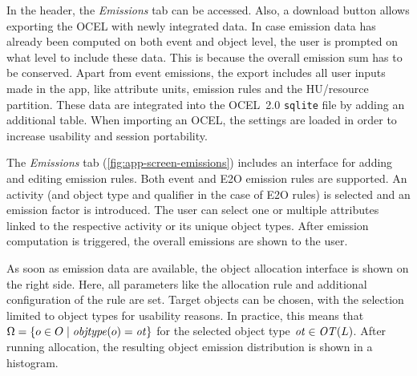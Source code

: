 In the header, the \textit{Emissions} tab can be accessed. Also, a download button allows exporting the OCEL with newly integrated data.
In case emission data has already been computed on both event and object level,
the user is prompted on what level to include these data.
This is because the overall emission sum has to be conserved.
Apart from event emissions, the export includes all user inputs made in the app, like attribute units, emission rules and the HU/resource partition.
These data are integrated into the OCEL~2.0 \texttt{sqlite} file by adding an additional table. When importing an OCEL, the settings are loaded in order to increase usability and session portability.

The \textit{Emissions} tab (\autoref{fig:app-screen-emissions}) includes an interface for adding and editing emission rules. Both event and E2O emission rules are supported. An activity (and object type and qualifier in the case of E2O rules) is selected and an emission factor is introduced. The user can select one or multiple attributes linked to the respective activity or its unique object types.
After emission computation is triggered, the overall emissions are shown to the user.

As soon as emission data are available, the object allocation interface is shown on the right side. Here, all parameters like the allocation rule and additional configuration of the  rule are set. Target objects can be chosen, with the selection limited to object types for usability reasons. In practice, this means that $\Omega=\{ o\in O \mid \mathit{objtype}(o)=\mathit{ot} \}$ for the selected object type $\mathit{ot}\in\mathit{OT}(L)$.
After running allocation, the resulting object emission distribution is shown in a histogram.


